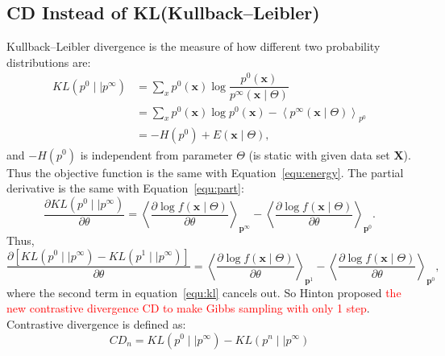 \documentclass[11pt,twoside,a4paper]{article}
\begin{document}
\subsection{CD Instead of KL(Kullback–Leibler)}
	Kullback–Leibler divergence is the measure of how different two probability distributions are:
	\begin{equation}
	\begin{aligned}
	KL(p^0 \mid \mid p^{\infty})
	&= \sum_x p^0(\mathbf{x}) \log \dfrac{p^0(\mathbf{x})}{p^{\infty}(\mathbf{x} \mid \Theta)} \\
	&=  \sum_x p^0(\mathbf{x}) \log p^0(\mathbf{x}) - \left \langle p^{\infty}(\mathbf{x} \mid \Theta) \right \rangle_{p^0} \\
	&= - H(p^0) + E(\mathbf{x} \mid \Theta),
	\end{aligned}
	\end{equation}
	and $ - H(p^0)  $ is independent from parameter $ \Theta $ (is static with given data set $ \mathbf{X} $).
	Thus the objective function is the same with Equation~\ref{equ:energy}.
	The partial derivative is the same with Equation~\ref{equ:part}:
	\begin{equation}
		\label{equ:kl}
		\dfrac{\partial KL(p^0 \mid \mid p^{\infty})}{\partial \theta}
		= \left \langle \dfrac{\partial \log f(\mathbf{x} \mid \Theta)}{\partial \theta}\right \rangle_{\mathbf{p}^\infty} - \left \langle \dfrac{\partial \log f(\mathbf{x} \mid \Theta)}{\partial \theta}\right \rangle_{\mathbf{p}^0}.
	\end{equation}
	Thus,
	\begin{equation}
		\dfrac{\partial [KL(p^0 \mid \mid p^{\infty}) - KL(p^1 \mid \mid p^{\infty})]}{\partial \theta}
		= \left \langle \dfrac{\partial \log f(\mathbf{x} \mid \Theta)}{\partial \theta}\right \rangle_{\mathbf{p}^1} - \left \langle \dfrac{\partial \log f(\mathbf{x} \mid \Theta)}{\partial \theta}\right \rangle_{\mathbf{p}^0},
	\end{equation}
	where the second term in equation~\ref{equ:kl} cancels out.
	So Hinton proposed \textcolor{red}{the new contrastive divergence CD to make Gibbs sampling with only 1 step}.
	Contrastive divergence is defined as:
	\begin{equation}
		CD_n = KL(p^0 \mid \mid p^{\infty}) - KL(p^n \mid \mid p^{\infty})
	\end{equation}
\end{document}
